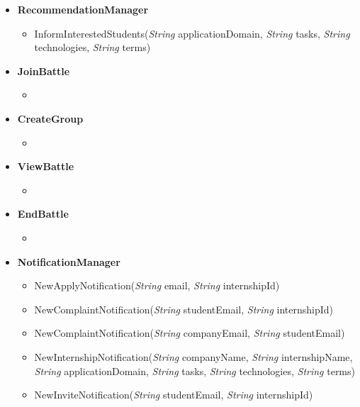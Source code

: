\begin{itemize}
    \item \textbf{\textbf{RecommendationManager}}
\begin{itemize}
        \item InformInterestedStudents(\textit{String} applicationDomain, \textit{String} tasks, \textit{String} technologies, \textit{String}  terms)
\end{itemize}

\end{itemize}

\begin{itemize}
    \item \textbf{\textbf{JoinBattle}}
\begin{itemize}
    \item 
    \end{itemize}


    \item \textbf{\textbf{CreateGroup}}
\begin{itemize}
        \item 
\end{itemize}

    \item \textbf{\textbf{ViewBattle}}
    \begin{itemize}
        \item 
\end{itemize}

    \item \textbf{\textbf{EndBattle}}
\begin{itemize}
        \item 
\end{itemize}

    \item \textbf{\textbf{NotificationManager}}
\begin{itemize}
        \item NewApplyNotification(\textit{String} email, \textit{String} internshipId)
        \item NewComplaintNotification(\textit{String} studentEmail, \textit{String} internshipId)
        \item NewComplaintNotification(\textit{String} companyEmail, \textit{String} studentEmail)
        \item NewInternshipNotification(\textit{String}  companyName, \textit{String} internshipName, \textit{String} applicationDomain, \textit{String} tasks, \textit{String} technologies, \textit{String}  terms)
        \item NewInviteNotification(\textit{String} studentEmail, \textit{String} internshipId)
\end{itemize}

\end{itemize}


